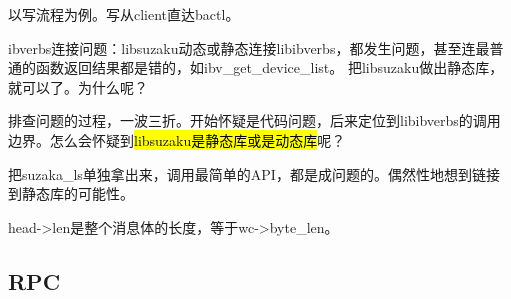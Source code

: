 以写流程为例。写从client直达bactl。


\hrulefill

ibverbs连接问题：libsuzaku动态或静态连接libibverbs，都发生问题，甚至连最普通的函数返回结果都是错的，如ibv\_get\_device\_list。
把libsuzaku做出静态库，就可以了。为什么呢？

排查问题的过程，一波三折。开始怀疑是代码问题，后来定位到libibverbs的调用边界。怎么会怀疑到\hl{libsuzaku是静态库或是动态库}呢？

把suzaka\_ls单独拿出来，调用最简单的API，都是成问题的。偶然性地想到链接到静态库的可能性。


head->len是整个消息体的长度，等于wc->byte\_len。

\subsection{RPC}
